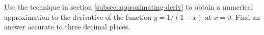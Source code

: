 Use the technique in section \ref{subsec:approximating-deriv} to
obtain a numerical approximation to the derivative of the
function $y=1/(1-x)$ at $x=0$. Find an answer accurate to
three decimal places.
